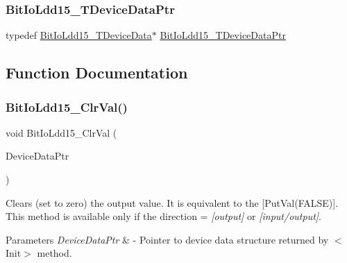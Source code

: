 \subsubsection{\texorpdfstring{Bit\+Io\+Ldd15\+\_\+\+T\+Device\+Data\+Ptr}{BitIoLdd15\_TDeviceDataPtr}}
{\footnotesize\ttfamily typedef \hyperlink{struct_bit_io_ldd15___t_device_data}{Bit\+Io\+Ldd15\+\_\+\+T\+Device\+Data}$\ast$ \hyperlink{group___bit_io_ldd15__module_gab121a1bc3c07e68d2b0beb9e835ab51f}{Bit\+Io\+Ldd15\+\_\+\+T\+Device\+Data\+Ptr}}



\subsection{Function Documentation}
\mbox{\label{group___bit_io_ldd15__module_ga4d39e4bded6e2f7edd0f350a6d72d2f6}} 
\subsubsection{\texorpdfstring{Bit\+Io\+Ldd15\+\_\+\+Clr\+Val()}{BitIoLdd15\_ClrVal()}}
{\footnotesize\ttfamily void Bit\+Io\+Ldd15\+\_\+\+Clr\+Val (\begin{DoxyParamCaption}\item[{\hyperlink{group___p_e___types__module_gac5cf1362f1f0e3a2ce71b1bf2276d091}{L\+D\+D\+\_\+\+T\+Device\+Data} $\ast$}]{Device\+Data\+Ptr }\end{DoxyParamCaption})}



Clears (set to zero) the output value. It is equivalent to the \mbox{[}Put\+Val(\+F\+A\+L\+S\+E)\mbox{]}. This method is available only if the direction = {\itshape \mbox{[}output\mbox{]}} or {\itshape \mbox{[}input/output\mbox{]}}. 


\begin{DoxyParams}{Parameters}
{\em Device\+Data\+Ptr} & -\/ Pointer to device data structure returned by $<$\+Init$>$ method. \\
\hline
\end{DoxyParams}
\mbox{\label{group___bit_io_ldd15__module_ga6b6e379b6e145395c401f29e07e51e6f}} 
